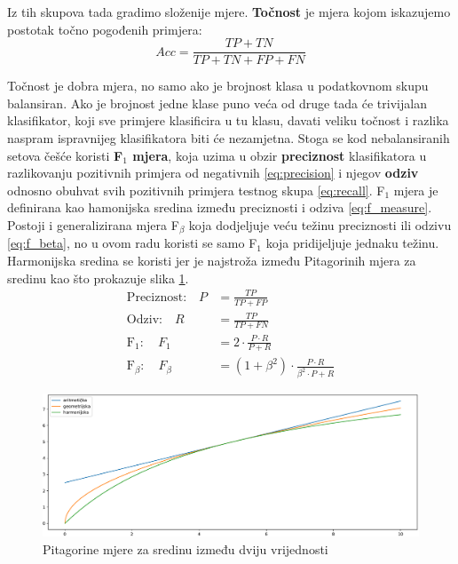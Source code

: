 \documentclass[times, utf8, diplomski]{fer}
\def\F1{F$_1$}
\begin{document}
Iz tih skupova tada gradimo složenije mjere. \textbf{Točnost} je mjera kojom iskazujemo postotak točno pogođenih primjera:
\begin{equation}
Acc = \frac{TP+TN}{TP+TN+FP+FN}
\end{equation}

Točnost je dobra mjera, no samo ako je brojnost klasa u podatkovnom skupu balansiran. Ako je brojnost jedne klase puno veća od druge tada će trivijalan klasifikator, koji sve primjere klasificira u tu klasu, davati veliku točnost i razlika naspram ispravnijeg klasifikatora biti će nezamjetna. Stoga se kod nebalansiranih setova češće koristi \textbf{\F1 mjera}, koja uzima u obzir \textbf{preciznost} klasifikatora u razlikovanju pozitivnih primjera od negativnih \eqref{eq:precision} i njegov \textbf{odziv} odnosno obuhvat svih pozitivnih primjera testnog skupa \eqref{eq:recall}. \F1 mjera je definirana kao hamonijska sredina između preciznosti i odziva \eqref{eq:f_measure}. Postoji i generalizirana mjera F$_\beta$ koja dodjeljuje veću težinu preciznosti ili odzivu \eqref{eq:f_beta}, no u ovom radu koristi se samo \F1 koja pridijeljuje jednaku težinu. Harmonijska sredina se koristi jer je najstroža između Pitagorinih mjera za sredinu kao što prokazuje slika \ref{fig:sredine}.
\begin{align}
\text{Preciznost:} \quad P &= \frac{TP}{TP+FP} \label{eq:precision} \\
\text{Odziv:} \quad R &= \frac{TP}{TP+FN} \label{eq:recall} \\
\text{F}_1: \quad F_1 &= 2 \cdot \frac{P \cdot R}{P + R} \label{eq:f_measure} \\
\text{F}_\beta: \quad F_\beta &= (1 + \beta^2) \cdot \frac{P \cdot R}{\beta ^2 \cdot P + R} \label{eq:f_beta}
\end{align}

\begin{figure}[h]
\includegraphics[width=\textwidth]{Pitagorine_sredine.pdf}
\centering
\caption{Pitagorine mjere za sredinu između dviju vrijednosti}
\label{fig:sredine}
\end{figure}
\end{document}

